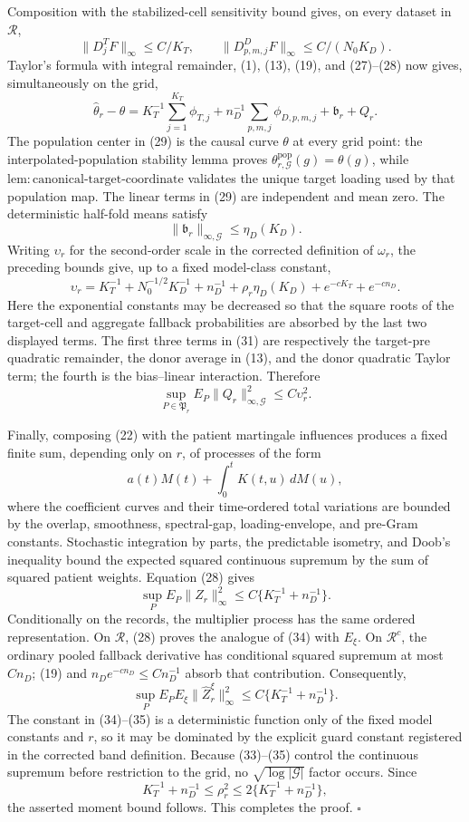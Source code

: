 Composition with the stabilized-cell sensitivity bound gives, on every
dataset in \(\mathcal R\),
\[
 \|D_j^TF\|_\infty\leq C/K_T,
 \qquad
 \|D_{p,m,j}^DF\|_\infty\leq C/(N_0K_D).                \tag{28}
\]
Taylor's formula with integral remainder, (1), (13), (19), and (27)--(28)
now gives, simultaneously on the grid,
\[
 \widehat\theta_r-\theta
 =K_T^{-1}\sum_{j=1}^{K_T}\phi_{T,j}
  +n_D^{-1}\sum_{p,m,j}\phi_{D,p,m,j}
  +\mathfrak b_r+Q_r.                                    \tag{29}
\]
The population center in (29) is the causal curve \(\theta\) at every grid
point: the interpolated-population stability lemma proves
\(\theta^{\mathrm{pop}}_{r,\mathcal G}(g)=\theta(g)\), while
\(\mathrm{lem:canonical\mbox{-}target\mbox{-}coordinate}\) validates the
unique target loading used by that population map.  The linear terms in (29)
are independent and mean zero.  The deterministic half-fold means satisfy
\[
 \|\mathfrak b_r\|_{\infty,\mathcal G}\leq\eta_D(K_D).  \tag{30}
\]
Writing \(\upsilon_r\) for the second-order scale in the corrected definition
of \(\omega_r\), the preceding bounds give, up to a fixed model-class
constant,
\[
 \upsilon_r
 =K_T^{-1}+N_0^{-1/2}K_D^{-1}+n_D^{-1}
  +\rho_r\eta_D(K_D)+e^{-cK_T}+e^{-cn_D}.                \tag{31}
\]
Here the exponential constants may be decreased so that the square roots of
the target-cell and aggregate fallback probabilities are absorbed by the last
two displayed terms.  The first three terms in (31) are respectively the
target-pre quadratic remainder, the donor average in (13), and the donor
quadratic Taylor term; the fourth is the bias--linear interaction.  Therefore
\[
 \sup_{P\in\mathfrak P_r}E_P
 \|Q_r\|_{\infty,\mathcal G}^2\leq C\upsilon_r^2.        \tag{32}
\]

Finally, composing (22) with the patient martingale influences produces a
fixed finite sum, depending only on \(r\), of processes of the form
\[
 a(t)M(t)+\int_0^tK(t,u)\,dM(u),                         \tag{33}
\]
where the coefficient curves and their time-ordered total variations are
bounded by the overlap, smoothness, spectral-gap, loading-envelope, and
pre-Gram constants.  Stochastic integration by parts, the predictable
isometry, and Doob's inequality bound the expected squared continuous
supremum by the sum of squared patient weights.  Equation (28) gives
\[
 \sup_PE_P\|Z_r\|_\infty^2
 \leq C\{K_T^{-1}+n_D^{-1}\}.                            \tag{34}
\]
Conditionally on the records, the multiplier process has the same ordered
representation.  On \(\mathcal R\), (28) proves the analogue of (34) with
\(E_\xi\).  On \(\mathcal R^c\), the ordinary pooled fallback derivative
has conditional squared supremum at most \(Cn_D\); (19) and
\(n_De^{-cn_D}\leq Cn_D^{-1}\) absorb that contribution.  Consequently,
\[
 \sup_PE_PE_\xi\|\widehat Z_r^\xi\|_\infty^2
 \leq C\{K_T^{-1}+n_D^{-1}\}.                            \tag{35}
\]
The constant in (34)--(35) is a deterministic function only of the fixed
model constants and \(r\), so it may be dominated by the explicit guard
constant registered in the corrected band definition.  Because (33)--(35)
control the continuous supremum before restriction to the grid, no
\(\sqrt{\log|\mathcal G|}\) factor occurs.  Since
\[
 K_T^{-1}+n_D^{-1}\leq\rho_r^2
 \leq2\{K_T^{-1}+n_D^{-1}\},
\]
the asserted moment bound follows.  This completes the proof. \(\square\)
